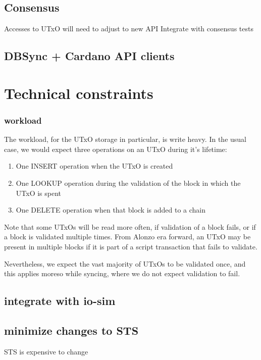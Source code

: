 \documentclass[11pt,a4paper]{article}
\begin{document}
\subsection{Consensus}

Accesses to UTxO will need to adjust to new API
Integrate with consensus tests


\subsection{DBSync + Cardano API clients}

\section{Technical constraints}
\label{constraints}

\subsubsection{workload}
\label{workload}
The workload, for the UTxO storage in particular, is write heavy. In the usual case, we would expect three operations on an UTxO during it's lifetime:

\begin{enumerate}
\item One INSERT operation when the UTxO is created
\item One LOOKUP operation during the validation of the block in which the UTxO is spent
\item One DELETE operation when that block is added to a chain
\end{enumerate}

Note that some UTxOs will be read more often, if validation of a block fails, or if a block is validated multiple times. From Alonzo era forward, an UTxO may be present in multiple blocks if it is part of a script transaction that fails to validate.

Nevertheless, we expect the vast majority of UTxOs to be validated once, and this applies moreso while syncing, where we do not expect validation to fail.

\subsection{integrate with io-sim}

\subsection{minimize changes to STS}
STS is expensive to change
\end{document}
